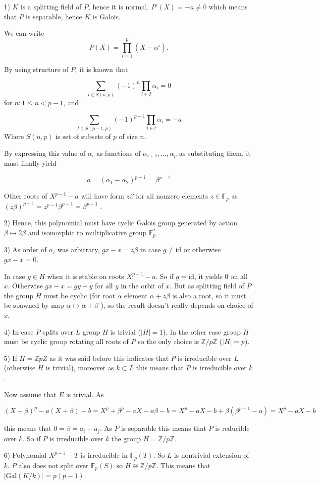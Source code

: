\documentclass[12pt]{article}
\begin{document}
1) $K$ is  a splitting field of $P$, hence it is normal.  $P'(X) = -a \neq 0 $ which means that $P$ is separable, hence $K$ is Galois.

We can write
$$
 P(X) = \prod^p_{i = 1}(X - \alpha^i).
$$

By using structure of $P$, it is known that 

$$
  \sum_{I \in S(n, p)}  (-1)^n \prod_{i \in I} \alpha_i  = 0
$$
 for  $n : 1 \le n < p - 1$, and

$$
  \sum_{ I \in S(p - 1, p)} (-1)^{p - 1} \prod_{i \in i } \alpha_i = -a  
$$ 
Where $S(n,p)$ is set of subsets of $p$ of size $n$.

By expressing this value of $\alpha_i$ as functions  of $\alpha_{i + 1}, \ldots, \alpha_p $ as substituting them, it must finally yield

$$
  a = ( \alpha_1 - \alpha_2 )^{p - 1} = \beta^{p - 1}
$$ 

Other roots of $X^{p-1} - a$ will have form $ z \beta $ for all nonzero elements $z \in \mathbb{F}_p$ as $(z \beta )^{p - 1} = z^{p-1}\beta^{p-1} = \beta^{p - 1} $  . 

2) Hence, this polynomial must have cyclic Galois group generated by action $ \beta \mapsto 2\beta $ and isomorphic to multiplicative group  $\mathbb{F}_p^*$ . 

3) As order of $\alpha_i$ was arbitrary, $gx - x = z\beta$ in case $g \neq \mathrm{id}$ or otherwise $gx - x = 0$.

In case $g \in H$ when it is stable on roots $X^{p -1} -  a$. So if $g = \mathrm{id}$, it yields 0 on all $x$. Otherwise  $gx - x = gy - y$ for all $y$ in the orbit of $x$. But as splitting field of $P$ the group $H$ must be cyclic  (for root $\alpha$ element $\alpha + z\beta$ is also a root, so it must be spawned by map $\alpha \mapsto \alpha + \beta $ ), so the result doesn't really depends on choice of $x$.

4) In case $P$ splits over $L$ group $H$ is trivial ($|H| = 1$). In the other case group $H$ must be cyclic group rotating all roots of $P$ so the only choice is $\mathbb{Z}/p{\mathbb{Z}}$ ($|H| = p$).

5)  If $H = \mathbb{Z}{pZ}$  as it was said before this indicates that $P$ is irreducible over $L$ (otherwise $H$ is trivial),  moreover as $k \subset L$ this means that $P$ is irreducible over $k$. 

Now  assume that $E$ is trivial. As 

$$
 (X  + \beta)^p - a(X + \beta) - b = X^p + \beta^p - aX -a\beta - b =  X^p - aX - b + \beta( \beta^{p - 1} - a) = X^p - aX - b
$$

this means that $0 = \beta = a_i - a_j$.  As $P$ is separable this means that $P$ is reducible over $k$. So if  $P$ is irreducible over $k$ the group $ H = \mathbb{Z}/p\mathbb{Z}$. 

6) Polynomial $  X^{p-1} -T$ is irreducible in $\mathbb{F}_p(T)$. So $L$ is nontrivial extension of $k$. $P$ also does not split over $\mathbb{F}_p(S)$ so $H \cong \mathbb{Z}/p \mathbb{Z}$. This means that $ |\mathrm{Gal}(K/k)| =p(p-1)$.
\end{document}
